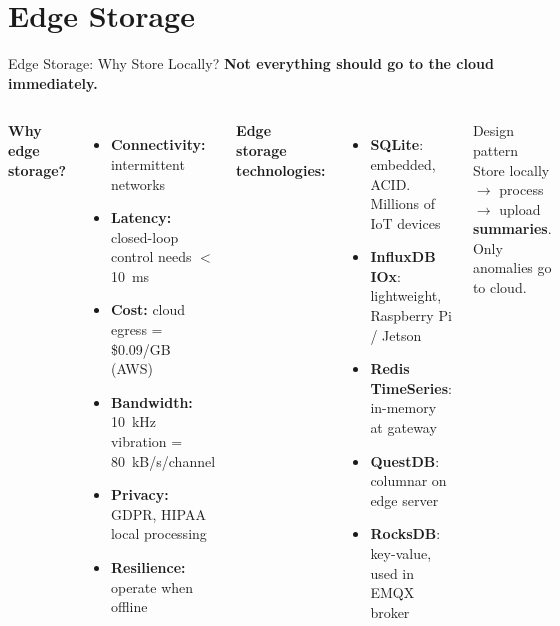 \documentclass[aspectratio=169,11pt]{beamer}
\begin{document}
\section{Edge Storage}

\begin{frame}{Edge Storage: Why Store Locally?}
    \small
    \textbf{Not everything should go to the cloud immediately.}

    \vspace{0.05cm}
    \begin{columns}
        \textbf{Why edge storage?}
        \begin{itemize}\setlength{\itemsep}{0pt}
            \item \textbf{Connectivity:} intermittent networks
            \item \textbf{Latency:} closed-loop control needs $<$10~ms
            \item \textbf{Cost:} cloud egress = \$0.09/GB (AWS)
            \item \textbf{Bandwidth:} 10~kHz vibration = 80~kB/s/channel
            \item \textbf{Privacy:} GDPR, HIPAA local processing
            \item \textbf{Resilience:} operate when offline
        \end{itemize}

        \textbf{Edge storage technologies:}
        \begin{itemize}\setlength{\itemsep}{0pt}
            \item \textbf{SQLite}: embedded, ACID. Millions of IoT devices
            \item \textbf{InfluxDB IOx}: lightweight, Raspberry Pi / Jetson
            \item \textbf{Redis TimeSeries}: in-memory at gateway
            \item \textbf{QuestDB}: columnar on edge server
            \item \textbf{RocksDB}: key-value, used in EMQX broker
        \end{itemize}

        \vspace{0.05cm}
        \begin{alertblock}{Design pattern}
            Store locally $\rightarrow$ process $\rightarrow$ upload \textbf{summaries}. Only anomalies go to cloud.
        \end{alertblock}
    \end{columns}
\end{frame}
\end{document}
